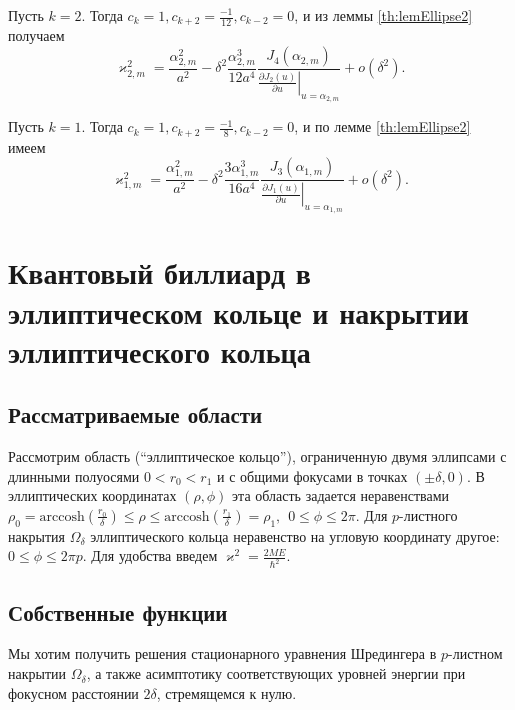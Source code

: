 Пусть $k =2$. Тогда $c_k = 1, c_{k+2}=\frac{-1}{12},  c_{k-2}=0$, и из леммы \ref{th:lemEllipse2} получаем
$$
\varkappa_{2, m}^2 = 
\frac{\alpha_{2, m}^2}{a^2} -  \delta^2 \frac{\alpha_{2, m}^3}{12 a^4}\frac{J_{4}(\alpha_{2, m})}{\left.\frac{\partial J_{2} (u)}{\partial u}\right|_{u=\alpha_{2, m}}} 
 + o(\delta^2).
$$

Пусть $k =1$. Тогда $c_k = 1, c_{k+2}=\frac{-1}{8},  c_{k-2}=0$, и по лемме \ref{th:lemEllipse2} имеем
$$
\varkappa_{1, m}^2 = 
\frac{\alpha_{1, m}^2}{a^2} -  \delta^2 \frac{3\alpha_{1, m}^3}{16 a^4}\frac{ J_{3}(\alpha_{1, m})}{\left.\frac{\partial J_{1} (u)}{\partial u}\right|_{u=\alpha_{1, m}}}  + o(\delta^2).
$$




\section{Квантовый биллиард в эллиптическом кольце и накрытии эллиптического кольца}\label{sec:ch2/sec3}
\subsection{Рассматриваемые области}\label{sec:ch2/sec3/subs1}

Рассмотрим область (``эллиптическое кольцо''), ограниченную двумя эллипсами с длинными полуосями $0 < r_0 < r_1$ и с общими фокусами в точках $(\pm \delta, 0)$. 
В эллиптических координатах $(\rho, \phi)$ эта область   задается неравенствами $\rho_0 = \text{arccosh} (\frac{r_0}{\delta}) \leq \rho \leq \text{arccosh} (\frac{r_1}{\delta}) = \rho_1, \hspace{5pt} 0 \leq \phi \leq 2 \pi$. 
Для $p$-листного накрытия  $\Omega_\delta$ эллиптического кольца неравенство на угловую координату другое: $0 \leq \phi \leq 2 \pi p$. Для удобства введем $\varkappa^2 = \frac{2 M E}{\hbar^2}$.

\subsection{Собственные функции}\label{sec:ch2/sec3/subs2}
Мы хотим получить решения стационарного уравнения
Шредингера в $p$-листном накрытии  $\Omega_\delta$, а также асимптотику соответствующих уровней энергии при фокусном расстоянии $2\delta$, стремящемся к нулю. %



